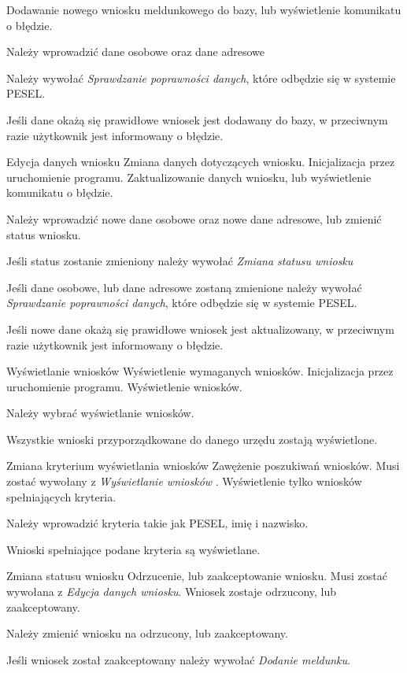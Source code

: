 \documentclass[12pt]{article}
\begin{document}
    {Dodawanie nowego wniosku meldunkowego do bazy, lub wyświetlenie komunikatu o błędzie.}
    {
        \item Należy wprowadzić dane osobowe oraz dane adresowe
        \item Należy wywołać \textit{Sprawdzanie poprawności danych}, które odbędzie się w systemie PESEL.
        \item Jeśli dane okażą się prawidłowe wniosek jest dodawany do bazy, w przeciwnym razie użytkownik jest informowany o błędzie.
    }
\scenario
    {Edycja danych wniosku}
    {Zmiana danych dotyczących wniosku.}
    {Inicjalizacja przez uruchomienie programu.}
    {Zaktualizowanie danych wniosku, lub wyświetlenie komunikatu o błędzie.}
    {
        \item Należy wprowadzić nowe dane osobowe oraz nowe dane adresowe, lub zmienić status wniosku.
        \item Jeśli status zostanie zmieniony należy wywołać \textit{Zmiana statusu wniosku}
        \item Jeśli dane osobowe, lub dane adresowe zostaną zmienione należy wywołać \textit{Sprawdzanie poprawności danych}, które odbędzie się w systemie PESEL.
        \item Jeśli nowe dane okażą się prawidłowe wniosek jest aktualizowany, w przeciwnym razie użytkownik jest informowany o błędzie.
    }
\scenario
    {Wyświetlanie wniosków}
    {Wyświetlenie wymaganych wniosków.}
    {Inicjalizacja przez uruchomienie programu.}
    {Wyświetlenie wniosków.}
    {
        \item Należy wybrać wyświetlanie wniosków.
        \item Wszystkie wnioski przyporządkowane do danego urzędu zostają wyświetlone.
    }
\scenario
    {Zmiana kryterium wyświetlania wniosków}
    {Zawężenie poszukiwań wniosków.}
    {Musi zostać wywołany z \textit{Wyświetlanie wniosków} .}
    {Wyświetlenie tylko wniosków spełniających kryteria.}
    {
        \item Należy wprowadzić kryteria takie jak PESEL, imię i nazwisko.
        \item Wnioski spełniające podane kryteria są wyświetlane.
    }
\scenario
    {Zmiana statusu wniosku}
    {Odrzucenie, lub zaakceptowanie wniosku.}
    {Musi zostać wywołana z \textit{Edycja danych wniosku}.}
    {Wniosek zostaje odrzucony, lub zaakceptowany.}
    {
        \item Należy zmienić wniosku na odrzucony, lub zaakceptowany.
        \item Jeśli wniosek został zaakceptowany należy wywołać \textit{Dodanie meldunku}.
    }
\end{document}
